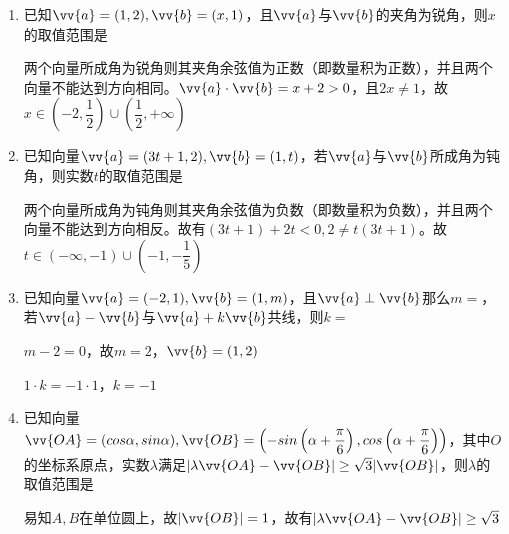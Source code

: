 \begin{enumerate}
    \begin{enumerate}
        \item 已知$\vv{a} = (1, 2), \vv{b} = (x, 1)$，且$\vv{a}$与$\vv{b}$的夹角为锐角，则$x$的取值范围是
        \begin{jieda}
            两个向量所成角为锐角则其夹角余弦值为正数（即数量积为正数），并且两个向量不能达到方向相同。$\vv{a} \cdot \vv{b} = x+2 > 0$，且$2x \neq 1$，故$x \in \left(-2, \dfrac{1}{2}\right) \cup \left(\dfrac{1}{2}, +\infty\right)$
        \end{jieda}
        \item 已知向量$\vv{a} = (3t+1, 2), \vv{b} = (1, t)$，若$\vv{a}$与$\vv{b}$所成角为钝角，则实数$t$的取值范围是
        \begin{jieda}
            两个向量所成角为钝角则其夹角余弦值为负数（即数量积为负数），并且两个向量不能达到方向相反。故有$(3t+1) + 2t < 0, 2 \neq t(3t+1)$。故$t \in (-\infty, -1) \cup \left(-1, -\dfrac{1}{5}\right)$
        \end{jieda}

        
        \item 已知向量$\vv{a} = (-2, 1), \vv{b} = (1, m)$，且$\vv{a} \perp \vv{b}$那么$m = $，若$\vv{a} - \vv{b}$与$\vv{a} + k\vv{b}$共线，则$k = $
        \begin{jieda}
            $m - 2 = 0$，故$m = 2$，$\vv{b} = (1, 2)$
            
            $1 \cdot k = -1 \cdot 1$，$k = -1$
        \end{jieda}

        \item 已知向量$\vv{OA} = (cos\alpha, sin\alpha), \vv{OB} = \left(-sin\left(\alpha+\dfrac{\pi}{6}\right), cos\left(\alpha + \dfrac{\pi}{6}\right)\right)$，其中$O$的坐标系原点，实数$\lambda$满足$|\lambda \vv{OA} - \vv{OB}| \geq \sqrt{3}|\vv{OB}|$，则$\lambda$的取值范围是\blkda[4]{$(-\infty, -2] \cup [1, +\infty)$}
        \begin{jieda}
            易知$A, B$在单位圆上，故$|\vv{OB}| = 1$，故有$|\lambda \vv{OA} - \vv{OB}| \geq \sqrt{3}$
            \begin{dingautolist}{172}
                \item 方法1
                
                $\lambda^2 |\vv{OA}|^2 + |\vv{OB}|^2 - 2\lambda \cdot \vv{OA} \cdot\vv{OB} \geq 3$ \\ 
                $\vv{OA} \cdot \vv{OB} = sin\alpha \cdot cos\left(\alpha + \dfrac{\pi}{6}\right) - cos\alpha \cdot sin\left(\alpha + \dfrac{\pi}{6}\right) = -\dfrac{1}{2}$，故$\lambda^2 + 1 + \lambda \geq 3$，解得$\lambda \in (-\infty, -2] \cup [1, +\infty)$


\end{dingautolist}
\end{jieda}
\end{enumerate}
\end{enumerate}
